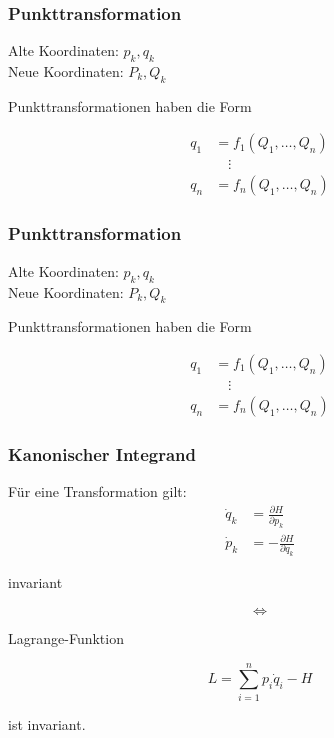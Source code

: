 \begin{frame}
    \frametitle{Punkttransformation}
    
    Alte Koordinaten: $p_k, q_k$ \\
    Neue Koordinaten: $P_k, Q_k$
    
    Punkttransformationen haben die Form
    
    \begin{align*}
    q_1 &= f_1(Q_1,\ldots,Q_n) \\
        &\quad\vdots \\
    q_n &= f_n(Q_1,\ldots,Q_n)    
    \end{align*}
    
\end{frame}

\begin{frame}
    \frametitle{Punkttransformation}
    
    Alte Koordinaten: $p_k, q_k$ \\
    Neue Koordinaten: $P_k, Q_k$
    
    Punkttransformationen haben die Form
    
    \begin{align*}
    q_1 &= f_1(Q_1,\ldots,Q_n) \\
    &\quad\vdots \\
    q_n &= f_n(Q_1,\ldots,Q_n)    
    \end{align*}
    
\end{frame}

\begin{frame}
    \frametitle{Kanonischer Integrand}
    
    Für eine Transformation gilt:
        \begin{align*}
        \dot{q}_k &= \frac{\partial H}{\partial p_k} \\
        \dot{p}_k &= -\frac{\partial H}{\partial q_k}		
        \end{align*}
      \begin{center}  invariant \end{center} 
        
        \begin{displaymath}
        \Longleftrightarrow
        \end{displaymath}
        
      \begin{center} Lagrange-Funktion \end{center} 
        \begin{displaymath}
        L = \sum_{i=1}^n p_i \dot{q}_i - H
        \end{displaymath}
      \begin{center}  ist invariant. \end{center} 

\end{frame}

